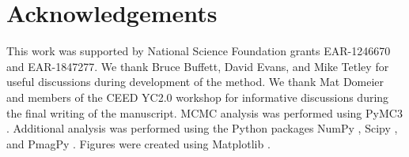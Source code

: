 \documentclass[11pt,letterpaper]{article}
\begin{document}
\section*{Acknowledgements}
\label{sec:acknowledgements}
This work was supported by National Science Foundation grants EAR-1246670 and EAR-1847277. We thank Bruce Buffett, David Evans, and Mike Tetley for useful discussions during development of the method. We thank Mat Domeier and members of the CEED YC2.0 workshop for informative discussions during the final writing of the manuscript. MCMC analysis was performed using PyMC3 \citep{Salvatier2016a}. Additional analysis was performed using the Python packages NumPy \citep{Harris2020a}, Scipy \citep{Virtanen2020a}, and PmagPy \citep{Tauxe2016a}. Figures were created using Matplotlib \citep{Hunter2007a}.

\clearpage
\newpage
\footnotesize

\singlespacing



\end{document}
